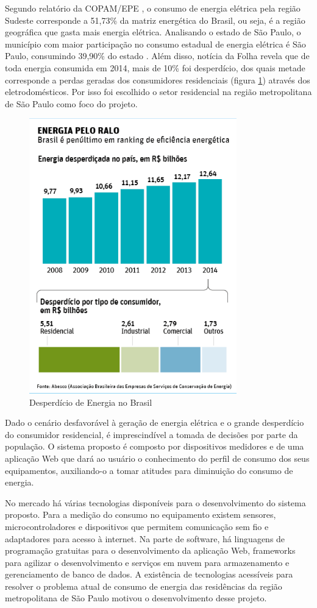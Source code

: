 Segundo relatório da COPAM/EPE \cite{copam_epe}, o consumo de energia elétrica pela região Sudeste corresponde a 51,73\% da matriz energética do Brasil, ou seja, é a região geográfica que gasta mais energia elétrica. Analisando o estado de São Paulo, o município com maior participação no consumo estadual de energia elétrica é São Paulo, consumindo 39,90\% do estado \cite{itu}. Além disso, notícia da Folha \cite{folha} revela que de toda energia consumida em 2014, mais de 10\% foi desperdício, dos quais metade corresponde a perdas geradas dos consumidores residenciais (figura \ref{fig:desperdicio}) através dos eletrodomésticos. Por isso foi escolhido o setor residencial na região metropolitana de São Paulo como foco do projeto.
%
\begin{figure}[H]
\centering
\includegraphics[width=9cm,keepaspectratio]{figuras/desperdicio.jpg}
\caption{\label{fig:desperdicio} Desperdício de Energia no Brasil}
\end{figure}
%
Dado o cenário desfavorável à geração de energia elétrica e o grande desperdício do consumidor residencial, é imprescindível a tomada de decisões por parte da população. O sistema proposto é composto por dispositivos medidores e de uma aplicação Web que dará ao usuário o conhecimento do perfil de consumo dos seus equipamentos, auxiliando-o a tomar atitudes para diminuição do consumo de energia.

No mercado há várias tecnologias disponíveis para o desenvolvimento do sistema proposto. Para a medição do consumo no equipamento existem sensores, microcontroladores e dispositivos que permitem comunicação sem fio e adaptadores para acesso à internet. Na parte de software, há linguagens de programação gratuitas para o desenvolvimento da aplicação Web, frameworks para agilizar o desenvolvimento e serviços em nuvem para armazenamento e gerenciamento de banco de dados. A existência de tecnologias acessíveis para resolver o problema atual de consumo de energia das residências da região metropolitana de São Paulo motivou o desenvolvimento desse projeto.
%
